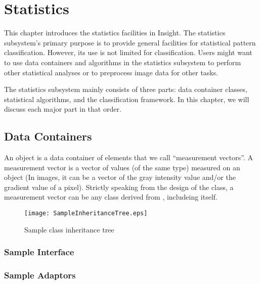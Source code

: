 \chapter{Statistics}
\label{sec:StaisticsFramework}

This chapter introduces the statistics facilities in Insight. The
statistics subsystem's primary purpose is to provide general facilities
for statistical pattern classification. However, its use is not limited
for classification. Users might want to use data containers and
algorithms in the statistics subsystem to perform other statistical
analyses or to preprocess image data for other tasks.

The statistics subsystem mainly consists of three parts: data container
classes, statistical algorithms, and the classification framework. In this
chapter, we will discuss each major part in that order.

\section{Data Containers}
\label{sec:StatisticsDataContainer}

An  object is a data container of
elements that we call ``measurement vectors''. A measurement vector is a
vector of values (of the same type) measured on an object (In images, it
can be a vector of the gray intensity value and/or the gradient value of
a pixel). Strictly speaking from the design of the
 class, a measurement vector can be any
class derived from , includeing 
itself.

\begin{figure}
  \centering
  \texttt{[image: SampleInheritanceTree.eps]}
  \caption{Sample class inheritance tree}
  \protect\label{fig:SampleInheritanceTree}
\end{figure}

\subsection{Sample Interface}
\label{sec:SampleInterface}



\subsection{Sample Adaptors}
\label{sec:SampleAdaptors}

